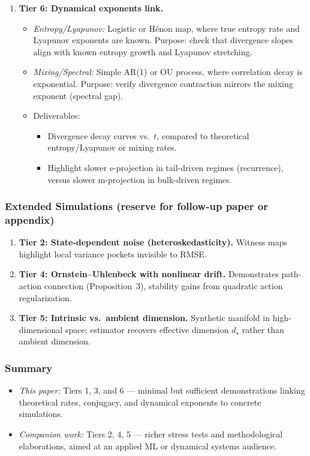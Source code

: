 \documentclass[11pt]{article}
\newcommand{\1}{\mathbf{1}}
\begin{document}
\begin{enumerate}
    \item \textbf{Tier 6: Dynamical exponents link.}
    \begin{itemize}
        \item \emph{Entropy/Lyapunov:} Logistic or H\'enon map, where true entropy rate and Lyapunov exponents are known. Purpose: check that divergence slopes align with known entropy growth and Lyapunov stretching.
        \item \emph{Mixing/Spectral:} Simple AR(1) or OU process, where correlation decay is exponential. Purpose: verify divergence contraction mirrors the mixing exponent (spectral gap).
        \item Deliverables:
            \begin{itemize}
                \item Divergence decay curves vs.\ $t$, compared to theoretical entropy/Lyapunov or mixing rates.
                \item Highlight slower e-projection in tail-driven regimes (recurrence), versus slower m-projection in bulk-driven regimes.
            \end{itemize}
    \end{itemize}
\end{enumerate}

\subsubsection{Extended Simulations (reserve for follow-up paper or appendix)}
\begin{enumerate}
    \item \textbf{Tier 2: State-dependent noise (heteroskedasticity).} Witness maps highlight local variance pockets invisible to RMSE.
    \item \textbf{Tier 4: Ornstein--Uhlenbeck with nonlinear drift.} Demonstrates path-action connection (Proposition~3), stability gains from quadratic action regularization.
    \item \textbf{Tier 5: Intrinsic vs.\ ambient dimension.} Synthetic manifold in high-dimensional space; estimator recovers effective dimension $d_\star$ rather than ambient dimension.
\end{enumerate}

\subsubsection{Summary}
\begin{itemize}
    \item \emph{This paper:} Tiers 1, 3, and 6 --- minimal but sufficient demonstrations linking theoretical rates, conjugacy, and dynamical exponents to concrete simulations.
    \item \emph{Companion work:} Tiers 2, 4, 5 --- richer stress tests and methodological elaborations, aimed at an applied ML or dynamical systems audience.
\end{itemize}
\end{document}

